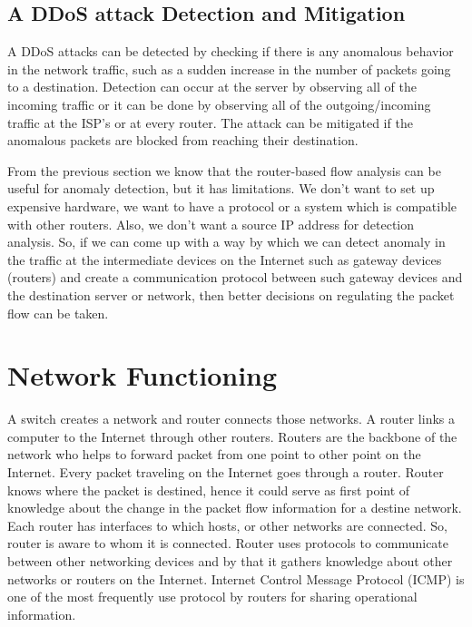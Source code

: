 \documentclass[12pt,oneside,a4paper]{article}
\begin{document}
\subsection{A DDoS attack Detection and Mitigation}

A DDoS attacks can be detected by checking if there is any anomalous behavior in the network traffic, such as a sudden increase in the number of packets going to a destination. Detection can occur at the server by observing all of the incoming traffic or it can be done by observing all of the outgoing/incoming traffic at the ISP's or at every router. The attack can be mitigated if the anomalous packets are blocked from reaching their destination.

From the previous section we know that the router-based flow analysis can be useful for anomaly detection, but it has limitations. We don't want to set up expensive hardware, we want to have a protocol or a system which is compatible with other routers. Also, we don't want a source IP address for detection analysis. So, if we can come up with a way by which we can detect anomaly in the traffic at the intermediate devices on the Internet such as gateway devices (routers) and create a communication protocol between such gateway devices and the destination server or network, then better decisions on regulating the packet flow can be taken.

\pagebreak
\section{Network Functioning}

A switch creates a network and router connects those networks. A router links a computer to the Internet through other routers. Routers are the backbone of the network who helps to forward packet from one point to other point on the Internet. Every packet traveling on the Internet goes through a router\cite{router-switch}. Router knows where the packet is destined, hence it could serve as first point of knowledge about the change in the packet flow information for a destine network. Each router has interfaces to which hosts, or other networks are connected. So, router is aware to whom it is connected. Router uses protocols to communicate between other networking devices and by that it gathers knowledge about other networks or routers on the Internet.  Internet Control Message Protocol (ICMP)\cite{icmp} is one of the most frequently use protocol by routers for sharing operational information.\par
\end{document}
